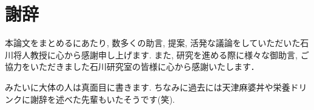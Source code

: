\chapter{謝辞}

本論文をまとめるにあたり, 数多くの助言, 提案, 活発な議論をしていただいた石川将人教授に心から感謝申し上げます. また, 研究を進める際に様々な御助言, ご協力をいただきました石川研究室の皆様に心から感謝いたします．

みたいに大体の人は真面目に書きます. ちなみに過去には天津麻婆丼や栄養ドリンクに謝辞を述べた先輩もいたそうです(笑). 
